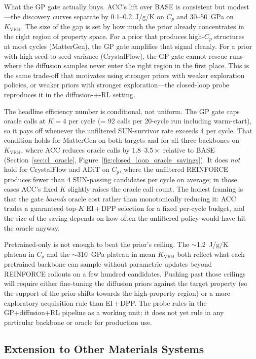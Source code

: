 What the GP gate actually buys.
ACC's lift over BASE is consistent but modest---the discovery curves separate by 0.1--0.2~J/g/K on $C_p$ and 30--50~GPa on $K_{\text{VRH}}$.
The size of the gap is set by how much the prior already concentrates in the right region of property space.
For a prior that produces high-$C_p$ structures at most cycles (MatterGen), the GP gate amplifies that signal cleanly.
For a prior with high seed-to-seed variance (CrystalFlow), the GP gate cannot rescue runs where the diffusion samples never enter the right region in the first place.
This is the same trade-off that motivates using stronger priors with weaker exploration policies, or weaker priors with stronger exploration---the closed-loop probe reproduces it in the diffusion-+-RL setting.

The headline efficiency number is conditional, not uniform.
The GP gate caps oracle calls at $K=4$ per cycle (= 92 calls per 20-cycle run including warm-start), so it pays off whenever the unfiltered SUN-survivor rate exceeds 4 per cycle.
That condition holds for MatterGen on both targets and for all three backbones on $K_{\text{VRH}}$, where ACC reduces oracle calls by $1.8$--$3.5\times$ relative to BASE (Section~\ref{sec:cl_oracle}, Figure~\ref{fig:closed_loop_oracle_savings}).
It does \emph{not} hold for CrystalFlow and ADiT on $C_p$, where the unfiltered REINFORCE produces fewer than 4 SUN-passing candidates per cycle on average; in those cases ACC's fixed $K$ slightly raises the oracle call count.
The honest framing is that the gate \emph{bounds} oracle cost rather than monotonically reducing it: ACC trades a guaranteed top-$K$ EI\,+\,DPP selection for a fixed per-cycle budget, and the size of the saving depends on how often the unfiltered policy would have hit the oracle anyway.

Pretrained-only is not enough to beat the prior's ceiling.
The $\sim$1.2~J/g/K plateau in $C_p$ and the $\sim$310~GPa plateau in mean $K_{\text{VRH}}$ both reflect what each pretrained backbone can sample without parametric updates beyond REINFORCE rollouts on a few hundred candidates.
Pushing past those ceilings will require either fine-tuning the diffusion priors against the target property (so the support of the prior shifts towards the high-property region) or a more exploratory acquisition rule than EI\,+\,DPP.
The probe rules in the GP+diffusion+RL pipeline as a working unit; it does not yet rule in any particular backbone or oracle for production use.

\FloatBarrier
\subsection{Extension to Other Materials Systems}
\label{sec:alloy_extension}

